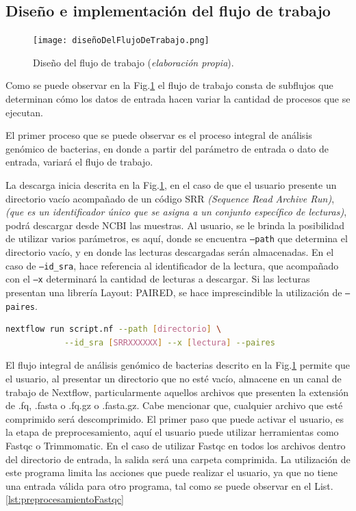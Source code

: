 \documentclass[12pt]{article}
\begin{document}
\subsection{Diseño e implementación del flujo de trabajo}

\begin{figure}[ht!]
    \centering
    \small
    \texttt{[image: diseñoDelFlujoDeTrabajo.png]}
    \caption{Diseño del flujo de trabajo (\emph{elaboración propia}).} 
    \label{fig:disenoDelFlujoDeTrabajo}
\end{figure}

Como se puede observar en la Fig.\ref{fig:disenoDelFlujoDeTrabajo} el flujo de trabajo 
consta de subflujos que determinan cómo los datos de entrada 
hacen variar la cantidad de procesos que se ejecutan.

El primer proceso que se puede observar es el proceso 
integral de análisis genómico de bacterias, en donde a partir 
del parámetro de entrada o dato de entrada, variará el flujo de 
trabajo.

La descarga inicia descrita en la Fig.\ref{fig:disenoDelFlujoDeTrabajo}, 
en el caso de que el usuario presente un directorio vacío 
acompañado de un código SRR \emph{(Sequence Read Archive Run)}, 
\emph{(que es un identificador único que se asigna a un conjunto 
específico de lecturas)}, podrá descargar desde NCBI las 
muestras. Al usuario, se le brinda la posibilidad de utilizar 
varios parámetros, es aquí, donde se encuentra \texttt{--path} que 
determina el directorio vacío, y en donde las lecturas
descargadas serán almacenadas. En el caso de \texttt{--id\_sra},
hace referencia al identificador de la lectura, que acompañado 
con el \texttt{--x} determinará la cantidad de lecturas a descargar. Si 
las lecturas presentan una librería Layout: PAIRED, se hace 
imprescindible la utilización de \texttt{--paires}.

\begin{center}
    \begin{lstlisting}[language=bash, caption=Sub-flujo de trabajo para la descarga inicial de lecturas \emph{(elaboración propia)}., label=lst:descargaInicial]
        nextflow run script.nf --path [directorio] \
            --id_sra [SRRXXXXXX] --x [lectura] --paires
    \end{lstlisting}
\end{center}

El flujo integral de análisis genómico de bacterias 
descrito en la Fig.\ref{fig:disenoDelFlujoDeTrabajo} permite 
que el usuario, al presentar un directorio que no esté vacío,  
almacene en un canal de trabajo 
de Nextflow, particularmente aquellos archivos que presenten la 
extensión de .fq, .fasta o .fq.gz o .fasta.gz. Cabe mencionar que, 
cualquier archivo que esté comprimido será descomprimido. El primer 
paso que puede activar el usuario, es la etapa de preprocesamiento, 
aquí el usuario puede utilizar herramientas como Fastqc o Trimmomatic. 
En el caso de utilizar Fastqc en todos los archivos dentro del 
directorio de entrada, la salida será una carpeta comprimida. La 
utilización de este programa limita las acciones que puede realizar 
el usuario, ya que no tiene una entrada válida para otro programa, 
tal como se puede observar en el List.\ref{lst:preprocesamientoFastqc}
\end{document}
